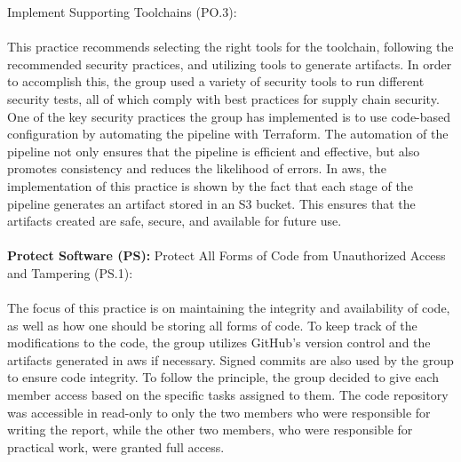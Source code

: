 Implement Supporting Toolchains (PO.3): \cite{ssdf}
\\~\\
This practice recommends selecting the right tools for the toolchain, following the recommended security practices, and utilizing tools to generate artifacts. In order to accomplish this, the group used a variety of security tools to run different security tests, all of which comply with best practices for supply chain security. One of the key security practices the group has implemented is to use code-based configuration by automating the pipeline with Terraform. The automation of the pipeline not only ensures that the pipeline is efficient and effective, but also promotes consistency and reduces the likelihood of errors. In \acrshort{aws}, the implementation of this practice is shown by the fact that each stage of the pipeline generates an artifact stored in an S3 bucket. This ensures that the artifacts created are safe, secure, and available for future use.
\\~\\        
\textbf{Protect Software (PS):}
Protect All Forms of Code from Unauthorized
Access and Tampering (PS.1): \cite{ssdf}
\\~\\
The focus of this practice is on maintaining the integrity and availability of code, as well as how one should be storing all forms of code. To keep track of the modifications to the code, the group utilizes GitHub's version control and the artifacts generated in \acrshort{aws} if necessary. Signed commits are also used by the group to ensure code integrity. To follow the  principle, the group decided to give each member access based on the specific tasks assigned to them. The code repository was accessible in read-only to only the two members who were responsible for writing the report, while the other two members, who were responsible for practical work, were granted full access. 

